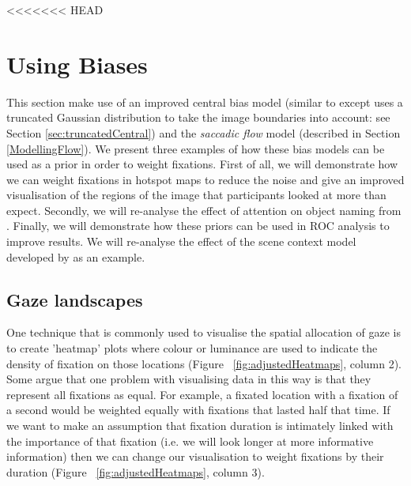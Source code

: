 <<<<<<< HEAD
\section{Using Biases}

This section make use of an improved central bias model (similar to \cite{clarke-tatler2014} except uses a truncated Gaussian distribution to take the image boundaries into account: see Section \ref{sec:truncatedCentral}) and the \textit{saccadic flow} model (described in Section \ref{ModellingFlow}). We present three examples of how these bias models can be used as a prior in order to weight fixations. First of all, we will demonstrate how we can weight fixations in hotspot maps to reduce the noise and give an improved visualisation of the regions of the image that participants looked at more than expect. Secondly, we will re-analyse the effect of attention on object naming from \cite{clarke2013}.  Finally, we will demonstrate how these priors can be used in ROC analysis to improve results. We will re-analyse the effect of the scene context model developed by  \cite{ehinger2009} as an example. 

\subsection{Gaze landscapes}

One technique that is commonly used to visualise the spatial allocation of gaze is to create 'heatmap' plots where colour or luminance are used to indicate the density of fixation on those locations (Figure ~\ref{fig:adjustedHeatmaps}, column 2). Some argue that one problem with visualising data in this way is that they represent all fixations as equal. For example, a fixated location with a fixation of a second would be weighted equally with fixations that lasted half that time. If we want to make an assumption that fixation duration is intimately linked with the importance of that fixation (i.e. we will look longer at more informative information) then we can change our visualisation to weight fixations by their duration (Figure ~\ref{fig:adjustedHeatmaps}, column 3).

